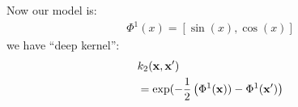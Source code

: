 \newsavebox\deepkernelstwo
\begin{lrbox}{\deepkernelstwo}
  \begin{minipage}{0.4\textwidth}
Now our model is:
    \begin{align*}
\Phi^{1}(x) = \left[ \sin(x), \cos(x) \right]
    \end{align*} 
	we have ``deep kernel'':
	\begin{align*}
	& k_2({\bf{x}}, {\bf{x}}') \\ 
	& = \exp(-\frac{1}{2} \left( \Phi^{1}({\bf{x}})) - \Phi^{1}({\bf{x}}') \right)
	\end{align*}
  \end{minipage}
\end{lrbox}

\newcommand{\numhiddenper}[0]{2}

